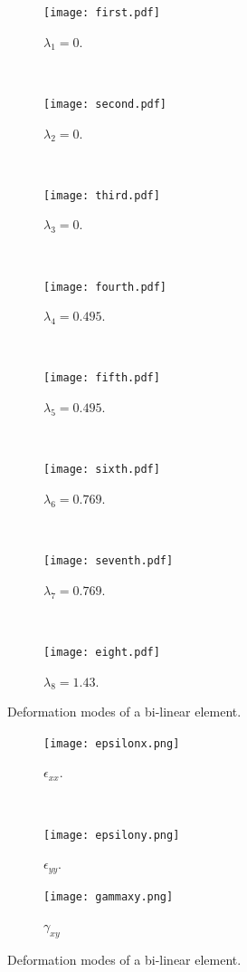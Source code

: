 \begin{figure}[H]
\centering
	\begin{subfigure}[b]{0.450\textwidth}\qquad
		\texttt{[image: first.pdf]}
		\caption{$\lambda_1 = 0$. }
	\end{subfigure}\,
%
	\begin{subfigure}[b]{0.450\textwidth}\qquad
		\texttt{[image: second.pdf]}
		\caption{$\lambda_2 = 0$.}
	\end{subfigure}\\
%
\centering
	\begin{subfigure}[b]{0.450\textwidth}\qquad
		\texttt{[image: third.pdf]}
		\caption{$\lambda_3 = 0$.}
	\end{subfigure}\,
%
	\begin{subfigure}[b]{0.450\textwidth}\qquad
		\texttt{[image: fourth.pdf]}
		\caption{$\lambda_4 = 0.495$.}
	\end{subfigure}\\
%
\centering
	\begin{subfigure}[b]{0.450\textwidth}\qquad
		\texttt{[image: fifth.pdf]}
		\caption{$\lambda_5 = 0.495$.}
	\end{subfigure}\,
%
	\begin{subfigure}[b]{0.450\textwidth}\qquad
		\texttt{[image: sixth.pdf]}
		\caption{$\lambda_6 = 0.769$.}
	\end{subfigure}\\
%
\centering
	\begin{subfigure}[b]{0.450\textwidth}\qquad
		\texttt{[image: seventh.pdf]}
		\caption{$\lambda_7 = 0.769$.}
	\end{subfigure}\,
%
	\begin{subfigure}[b]{0.450\textwidth}\qquad
		\texttt{[image: eight.pdf]}
		\caption{$\lambda_8 = 1.43$.}
	\end{subfigure}
%
\caption{Deformation modes of a bi-linear element.}
\label{modos}
\end{figure}



\begin{figure}[H]
\centering
	\begin{subfigure}[b]{0.450\textwidth}\qquad
		\texttt{[image: epsilonx.png]}
		\caption{$\epsilon_{xx}$.}
	\end{subfigure}\,
%
	\begin{subfigure}[b]{0.450\textwidth}\qquad
		\texttt{[image: epsilony.png]}
		\caption{$\epsilon_{yy}$.}
	\end{subfigure}
	\begin{subfigure}[b]{0.450\textwidth}\qquad
		\texttt{[image: gammaxy.png]}
		\caption{$\gamma_{xy}$}
	\end{subfigure}
%
\caption{Deformation modes of a bi-linear element.}
\label{strains}
\end{figure}



